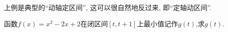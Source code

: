 上例是典型的“动轴定区间”, 这可以很自然地反过来, 即“定轴动区间”.

\begin{example}
    函数$f(x)=x^2-2x+2$在闭区间$[t,t+1]$上最小值记作$g(t)$,求$g(t)$.
\end{example}
\begin{jie}
    
\end{jie}
\clearpage